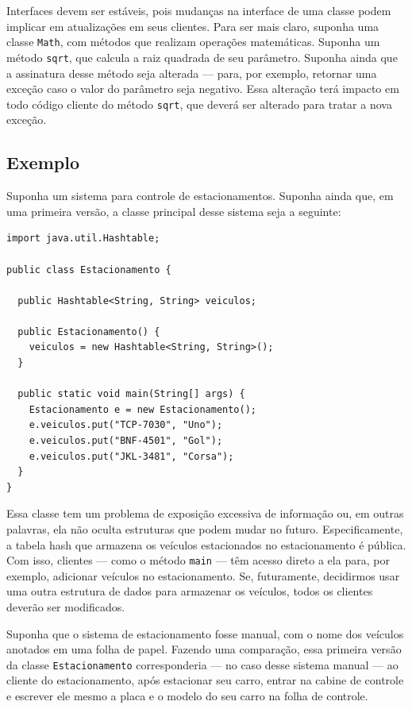 \documentclass[
  11pt,
  twoside]{book}
\newcommand{\passthrough}[1]{#1}
\begin{document}
Interfaces devem ser estáveis, pois mudanças na interface de uma classe
podem implicar em atualizações em seus clientes. Para ser mais claro,
suponha uma classe \passthrough{\lstinline!Math!}, com métodos que
realizam operações matemáticas. Suponha um método
\passthrough{\lstinline!sqrt!}, que calcula a raiz quadrada de seu
parâmetro. Suponha ainda que a assinatura desse método seja alterada ---
para, por exemplo, retornar uma exceção caso o valor do parâmetro seja
negativo. Essa alteração terá impacto em todo código cliente do método
\passthrough{\lstinline!sqrt!}, que deverá ser alterado para tratar a
nova exceção.

\hypertarget{exemplo-1}{%
\subsection{Exemplo}\label{exemplo-1}}

Suponha um sistema para controle de estacionamentos. Suponha ainda que,
em uma primeira versão, a classe principal desse sistema seja a
seguinte:

\begin{lstlisting}
import java.util.Hashtable;

public class Estacionamento {

  public Hashtable<String, String> veiculos;

  public Estacionamento() {
    veiculos = new Hashtable<String, String>();
  }

  public static void main(String[] args) {
    Estacionamento e = new Estacionamento();
    e.veiculos.put("TCP-7030", "Uno");
    e.veiculos.put("BNF-4501", "Gol");
    e.veiculos.put("JKL-3481", "Corsa");
  }
}
\end{lstlisting}

Essa classe tem um problema de exposição excessiva de informação ou, em
outras palavras, ela não oculta estruturas que podem mudar no futuro.
Especificamente, a tabela hash que armazena os veículos estacionados no
estacionamento é pública. Com isso, clientes --- como o método
\passthrough{\lstinline!main!} --- têm acesso direto a ela para, por
exemplo, adicionar veículos no estacionamento. Se, futuramente,
decidirmos usar uma outra estrutura de dados para armazenar os veículos,
todos os clientes deverão ser modificados.

Suponha que o sistema de estacionamento fosse manual, com o nome dos
veículos anotados em uma folha de papel. Fazendo uma comparação, essa
primeira versão da classe \passthrough{\lstinline!Estacionamento!}
corresponderia --- no caso desse sistema manual --- ao cliente do
estacionamento, após estacionar seu carro, entrar na cabine de controle
e escrever ele mesmo a placa e o modelo do seu carro na folha de
controle.
\end{document}
